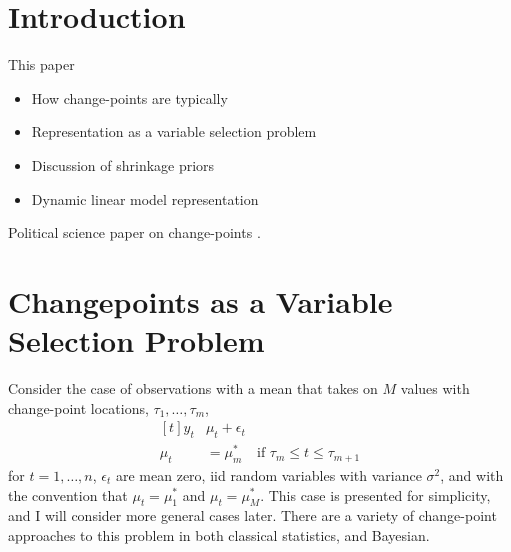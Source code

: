 
\section{Introduction}
\label{dlm:sec:introduction}

This paper 


\begin{itemize}
\item How change-points are typically 
\item Representation as a variable selection problem
\item Discussion of shrinkage priors
\item Dynamic linear model representation
\end{itemize}

Political science paper on change-points \parencites{CalderiaZorn1998}{WesternKleykamp2004}{Spirling2007a}{Spirling2007b}{Park2010}{Park2011}{Blackwell2012}.

\section{Changepoints as a Variable Selection Problem}
\label{dlm:sec:chang-as-vari}

Consider the case of observations with a mean that takes on $M$ values with change-point locations, $\tau_{1}, \dots, \tau_{m}$,
\begin{equation}
  \label{dlm:eq:1}
  \begin{aligned}[t]
    y_{t} & \mu_{t} + \epsilon_{t} \\
    \mu_{t} &= \mu^{*}_{m} & \text{if $\tau_{m} \leq t \leq \tau_{m + 1}$}
  \end{aligned}
\end{equation}
for $t = 1, \dots, n$, $\epsilon_{t}$ are mean zero, iid random variables with variance $\sigma^{2}$, and with the convention that  $\mu_{t} = \mu^{*}_{1}$ and $\mu_{t} = \mu^{*}_{M}$.
This case is presented for simplicity, and I will consider more general cases later.
There are a variety of change-point approaches to this problem in both classical statistics, and Bayesian.

